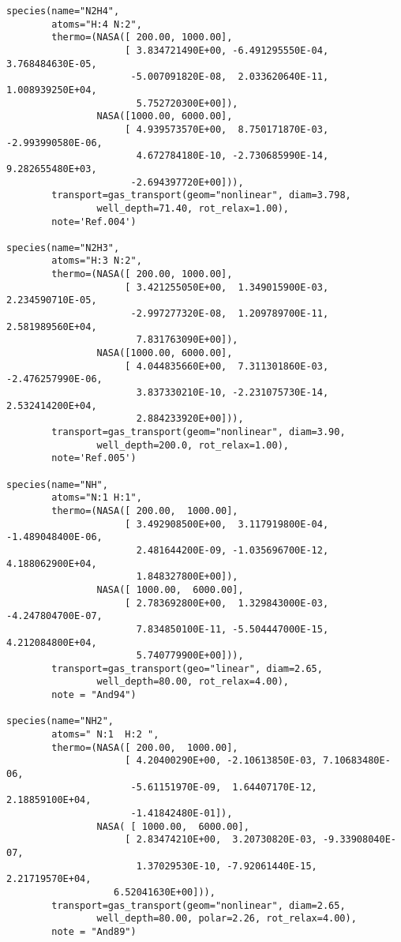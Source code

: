 \begin{verbatim}
species(name="N2H4",
        atoms="H:4 N:2",
        thermo=(NASA([ 200.00, 1000.00],
                     [ 3.834721490E+00, -6.491295550E-04,  3.768484630E-05,
                      -5.007091820E-08,  2.033620640E-11,  1.008939250E+04,
                       5.752720300E+00]),
                NASA([1000.00, 6000.00],
                     [ 4.939573570E+00,  8.750171870E-03, -2.993990580E-06,
                       4.672784180E-10, -2.730685990E-14,  9.282655480E+03,
                      -2.694397720E+00])),
        transport=gas_transport(geom="nonlinear", diam=3.798,
                well_depth=71.40, rot_relax=1.00),
        note='Ref.004')

species(name="N2H3",
        atoms="H:3 N:2",
        thermo=(NASA([ 200.00, 1000.00],
                     [ 3.421255050E+00,  1.349015900E-03,  2.234590710E-05,
                      -2.997277320E-08,  1.209789700E-11,  2.581989560E+04,
                       7.831763090E+00]),
                NASA([1000.00, 6000.00],
                     [ 4.044835660E+00,  7.311301860E-03, -2.476257990E-06,
                       3.837330210E-10, -2.231075730E-14,  2.532414200E+04,
                       2.884233920E+00])),
        transport=gas_transport(geom="nonlinear", diam=3.90,
                well_depth=200.0, rot_relax=1.00),
        note='Ref.005')

species(name="NH",
        atoms="N:1 H:1",
        thermo=(NASA([ 200.00,  1000.00], 
                     [ 3.492908500E+00,  3.117919800E-04, -1.489048400E-06,
                       2.481644200E-09, -1.035696700E-12,  4.188062900E+04,
                       1.848327800E+00]),
                NASA([ 1000.00,  6000.00], 
                     [ 2.783692800E+00,  1.329843000E-03, -4.247804700E-07,
                       7.834850100E-11, -5.504447000E-15,  4.212084800E+04,
                       5.740779900E+00])),
        transport=gas_transport(geo="linear", diam=2.65,
                well_depth=80.00, rot_relax=4.00),
        note = "And94")

species(name="NH2",
        atoms=" N:1  H:2 ",
        thermo=(NASA([ 200.00,  1000.00], 
                     [ 4.20400290E+00, -2.10613850E-03, 7.10683480E-06,
                      -5.61151970E-09,  1.64407170E-12, 2.18859100E+04,
                      -1.41842480E-01]),
                NASA( [ 1000.00,  6000.00], 
                     [ 2.83474210E+00,  3.20730820E-03, -9.33908040E-07,       
                       1.37029530E-10, -7.92061440E-15,  2.21719570E+04, 
                   6.52041630E+00])),
        transport=gas_transport(geom="nonlinear", diam=2.65,
                well_depth=80.00, polar=2.26, rot_relax=4.00),
        note = "And89")


\end{verbatim}
